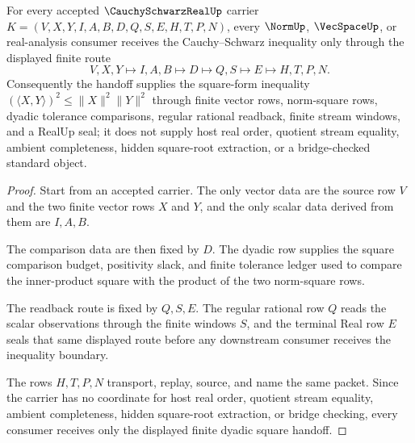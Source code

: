 \begin{theorem}
\label{thm:cauchy-schwarz-real-dyadic-square-handoff}
For every accepted $\CauchySchwarzRealUp$ carrier $K=(V,X,Y,I,A,B,D,Q,S,E,H,T,P,N)$, every $\NormUp$, $\VecSpaceUp$, or real-analysis consumer receives the Cauchy--Schwarz inequality only through the displayed finite route
$$
V,X,Y \longmapsto I,A,B \longmapsto D \longmapsto Q,S \longmapsto E \longmapsto H,T,P,N .
$$
Consequently the handoff supplies the square-form inequality $(\langle X,Y\rangle)^2\leq \|X\|^2\|Y\|^2$ through finite vector rows, norm-square rows, dyadic tolerance comparisons, regular rational readback, finite stream windows, and a RealUp seal; it does not supply host real order, quotient stream equality, ambient completeness, hidden square-root extraction, or a bridge-checked standard object.
\end{theorem}
\begin{proof}
Start from an accepted carrier. The only vector data are the source row $V$ and the two finite vector rows $X$ and $Y$, and the only scalar data derived from them are $I,A,B$.

The comparison data are then fixed by $D$. The dyadic row supplies the square comparison budget, positivity slack, and finite tolerance ledger used to compare the inner-product square with the product of the two norm-square rows.

The readback route is fixed by $Q,S,E$. The regular rational row $Q$ reads the scalar observations through the finite windows $S$, and the terminal Real row $E$ seals that same displayed route before any downstream consumer receives the inequality boundary.

The rows $H,T,P,N$ transport, replay, source, and name the same packet. Since the carrier has no coordinate for host real order, quotient stream equality, ambient completeness, hidden square-root extraction, or bridge checking, every consumer receives only the displayed finite dyadic square handoff.
\end{proof}

